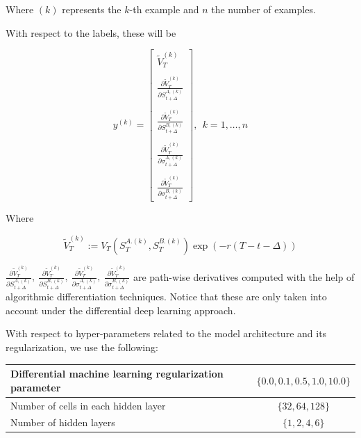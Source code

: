 Where $(k)$ represents the $k$-th example and $n$ the number of examples.

With respect to the labels, these will be 

$$
y^{(k)}=\left[\begin{array}{l}
\tilde{V}_{T}^{(k)} \\ \\
\frac{\partial \tilde{V}_{T}^{(k)}}{\partial S_{t+\Delta}^{A,(k)}} \\ \\
\frac{\partial \tilde{V}_{T}^{(k)}}{\partial S_{t+\Delta}^{B,(k)}} \\ \\
\frac{\partial \tilde{V}_{T}^{(k)}}{\partial \sigma_{t+\Delta}^{A,(k)}} \\ \\
\frac{\partial \tilde{V}_{T}^{(k)}}{\partial \sigma_{t+\Delta}^{B,(k)}}
\end{array}\right],\ \ k=1, \ldots, n
$$

Where

$$\tilde{V}_{T}^{(k)} := V_T\left(S_T^{A.(k)}, S_T^{B.(k)}\right)\exp\left(-r\left(T-t-\Delta\right)\right)$$

$\frac{\partial \tilde{V}_{T}^{(k)}}{\partial S_{t+\Delta}^{A,(k)}},\  
\frac{\partial \tilde{V}_{T}^{(k)}}{\partial S_{t+\Delta}^{B,(k)}},\ 
\frac{\partial \tilde{V}_{T}^{(k)}}{\partial \sigma_{t+\Delta}^{A,(k)}},\ 
\frac{\partial \tilde{V}_{T}^{(k)}}{\partial \sigma_{t+\Delta}^{B,(k)}}
$ are path-wise derivatives computed with the help of algorithmic differentiation techniques. Notice that these are only taken into account under the differential deep learning approach.

With respect to hyper-parameters related to the model architecture and its regularization, we use the following:


\begin{center}
\begin{tabular}{||l | c||} 
 \hline
 Differential machine learning regularization parameter & $\{0.0, 0.1, 0.5, 1.0, 10.0\}$ \\
 \hline
 Number of cells in each hidden layer  & $\{32, 64, 128\}$  \\
 \hline
 Number of hidden layers  & $\{1 ,2 ,4 ,6\}$  \\
 \hline
 \end{tabular}
\end{center}


